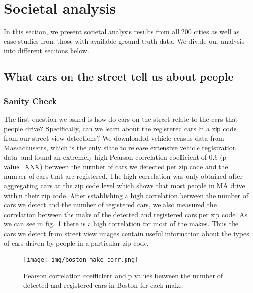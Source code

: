 \documentclass[10pt,twocolumn,letterpaper]{article}
\begin{document}
 \section{Societal analysis}
\label{sec:social}
In this section, we present societal analysis results from all 200 cities as well as case studies from those with available ground truth data. We divide our analysis into different sections below.

\subsection{What cars on the street tell us about people}

\subsubsection{Sanity Check}
The first question we asked is how do cars on the street relate to the cars that people drive? Specifically,
can we learn about the registered cars in a zip code from our street view detections?
We downloaded vehicle census data from Massachusetts, which is the only state to release extensive vehicle registration data, and found an extremely high Pearson correlation coefficient of 0.9 (p value=XXX) between the number of cars we detected per zip code and the number of cars that are registered. The high correlation was only obtained after aggregating cars at the zip code level which shows that most people in MA drive within their zip code. 
After establishing a high correlation between the number of cars we detect and the number of registered cars, we also measured the correlation between the make of the detected and registered cars per zip code. As we can see in fig.~\ref{fig:ma_corrs} there is a high correlation for most of the makes. Thus the cars we detect from street view images contain useful information about the types of cars driven by people in a particular zip code.

\begin{figure} [t]
\begin{center}
\texttt{[image: img/boston\_make\_corr.png]}
\end{center}
\caption {Pearson correlation coefficient and p values between the number of detected and registered cars in Boston for each make.}
\label{fig:ma_corrs}
\end{figure}
\end{document}
